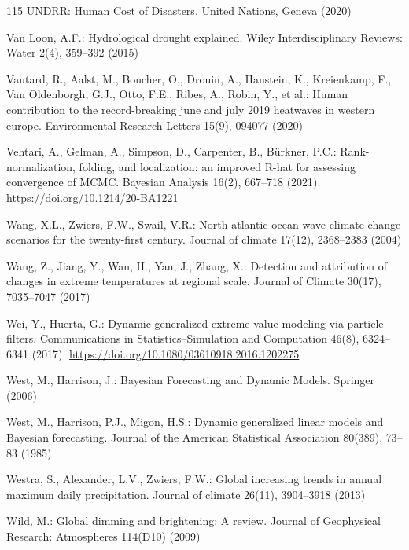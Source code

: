 \documentclass[11pt,a4paper]{article}
\begin{document}
\begin{thebibliography}{115}
		UNDRR: Human Cost of Disasters. United Nations, Geneva (2020)
		
		Van Loon, A.F.: Hydrological drought explained. Wiley Interdisciplinary Reviews: Water 2(4), 359--392 (2015)
		
		Vautard, R., Aalst, M., Boucher, O., Drouin, A., Haustein, K., Kreienkamp, F., Van Oldenborgh, G.J., Otto, F.E., Ribes, A., Robin, Y., et al.: Human contribution to the record-breaking june and july 2019 heatwaves in western europe. Environmental Research Letters 15(9), 094077 (2020)
		
		Vehtari, A., Gelman, A., Simpson, D., Carpenter, B., Bürkner, P.C.: Rank-normalization, folding, and localization: an improved R-hat for assessing convergence of MCMC. Bayesian Analysis 16(2), 667--718 (2021). \url{https://doi.org/10.1214/20-BA1221}
		
		Wang, X.L., Zwiers, F.W., Swail, V.R.: North atlantic ocean wave climate change scenarios for the twenty-first century. Journal of climate 17(12), 2368--2383 (2004)
		
		Wang, Z., Jiang, Y., Wan, H., Yan, J., Zhang, X.: Detection and attribution of changes in extreme temperatures at regional scale. Journal of Climate 30(17), 7035--7047 (2017)
		
		Wei, Y., Huerta, G.: Dynamic generalized extreme value modeling via particle filters. Communications in Statistics--Simulation and Computation 46(8), 6324--6341 (2017). \url{https://doi.org/10.1080/03610918.2016.1202275}
		
		West, M., Harrison, J.: Bayesian Forecasting and Dynamic Models. Springer (2006)
		
		West, M., Harrison, P.J., Migon, H.S.: Dynamic generalized linear models and Bayesian forecasting. Journal of the American Statistical Association 80(389), 73--83 (1985)
		
		Westra, S., Alexander, L.V., Zwiers, F.W.: Global increasing trends in annual maximum daily precipitation. Journal of climate 26(11), 3904--3918 (2013)
		
		Wild, M.: Global dimming and brightening: A review. Journal of Geophysical Research: Atmospheres 114(D10) (2009)
		

\end{thebibliography}
\end{document}
